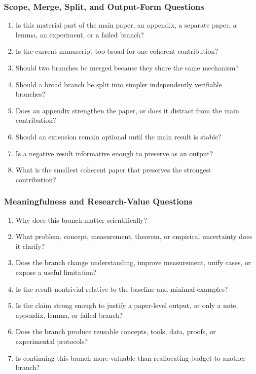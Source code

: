 \documentclass[11pt]{article}
\begin{document}
\subsubsection*{Scope, Merge, Split, and Output-Form Questions}
\begin{enumerate}[leftmargin=*]
    \item Is this material part of the main paper, an appendix, a separate paper, a lemma, an experiment, or a failed branch?
    \item Is the current manuscript too broad for one coherent contribution?
    \item Should two branches be merged because they share the same mechanism?
    \item Should a broad branch be split into simpler independently verifiable branches?
    \item Does an appendix strengthen the paper, or does it distract from the main contribution?
    \item Should an extension remain optional until the main result is stable?
    \item Is a negative result informative enough to preserve as an output?
    \item What is the smallest coherent paper that preserves the strongest contribution?
\end{enumerate}

\subsubsection*{Meaningfulness and Research-Value Questions}
\begin{enumerate}[leftmargin=*]
    \item Why does this branch matter scientifically?
    \item What problem, concept, measurement, theorem, or empirical uncertainty does it clarify?
    \item Does the branch change understanding, improve measurement, unify cases, or expose a useful limitation?
    \item Is the result nontrivial relative to the baseline and minimal examples?
    \item Is the claim strong enough to justify a paper-level output, or only a note, appendix, lemma, or failed branch?
    \item Does the branch produce reusable concepts, tools, data, proofs, or experimental protocols?
    \item Is continuing this branch more valuable than reallocating budget to another branch?
\end{enumerate}
\end{document}

